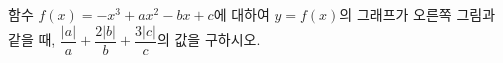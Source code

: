 \noindent\begin{minipage}[t]{0.58\linewidth}\vspace{0pt}\raggedright 함수 $f(x)=-x^3+ax^2-bx+c$에 대하여 $y=f(x)$의 그래프가 오른쪽 그림과 같을 때, $\dfrac{|a|}{a}+\dfrac{2|b|}{b}+\dfrac{3|c|}{c}$의 값을 구하시오. \end{minipage}\hfill\begin{minipage}[t]{0.4\linewidth}\vspace{0pt}\centering \resizebox{\ifdim\width>\linewidth\linewidth\else\width\fi}{!}{}\end{minipage}\par
